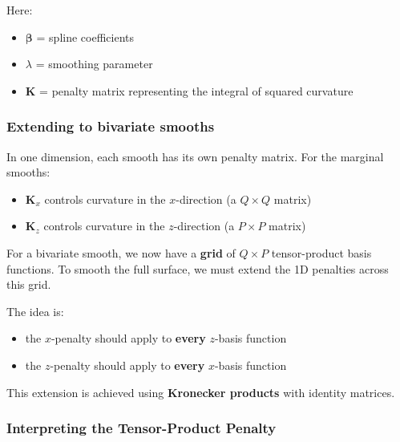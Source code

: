 \documentclass[
  letterpaper,
  DIV=11,
  numbers=noendperiod]{scrreprt}
\providecommand{\tightlist}{%
  \setlength{\itemsep}{0pt}\setlength{\parskip}{0pt}}\usepackage{longtable,booktabs,array}
\begin{document}
Here:

\begin{itemize}
\tightlist
\item
  \(\boldsymbol{\beta}\) = spline coefficients\\
\item
  \(\lambda\) = smoothing parameter\\
\item
  \(\mathbf{K}\) = penalty matrix representing the integral of squared
  curvature
\end{itemize}

\hypertarget{extending-to-bivariate-smooths}{%
\subsubsection*{Extending to bivariate
smooths}\label{extending-to-bivariate-smooths}}

In one dimension, each smooth has its own penalty matrix. For the
marginal smooths:

\begin{itemize}
\tightlist
\item
  \(\mathbf{K}_x\) controls curvature in the \(x\)-direction (a
  \(Q \times Q\) matrix)\\
\item
  \(\mathbf{K}_z\) controls curvature in the \(z\)-direction (a
  \(P \times P\) matrix)
\end{itemize}

For a bivariate smooth, we now have a \textbf{grid} of \(Q \times P\)
tensor-product basis functions. To smooth the full surface, we must
extend the 1D penalties across this grid.

The idea is:

\begin{itemize}
\tightlist
\item
  the \(x\)-penalty should apply to \textbf{every} \(z\)-basis
  function\\
\item
  the \(z\)-penalty should apply to \textbf{every} \(x\)-basis function
\end{itemize}

This extension is achieved using \textbf{Kronecker products} with
identity matrices.

\hypertarget{interpreting-the-tensor-product-penalty}{%
\subsubsection*{Interpreting the Tensor-Product
Penalty}\label{interpreting-the-tensor-product-penalty}}
\end{document}
